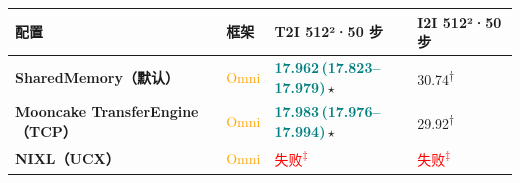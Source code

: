 \begin{tabularx}{\textwidth}{>{\bfseries}p{5.9cm} p{0.9cm} Y Y}
\toprule
{}
配置 & 框架 & T2I 512²·50 步 & I2I 512²·50 步 \\
\midrule
SharedMemory（默认） & \textcolor{Orange}{Omni} & \textbf{\textcolor{Teal}{17.962\,\textcolor{Muted}{(17.823--17.979)}}}\,$\star$ & \textcolor{Muted}{30.74\textsuperscript{†}} \\
Mooncake TransferEngine（TCP） & \textcolor{Orange}{Omni} & \textbf{\textcolor{Teal}{17.983\,\textcolor{Muted}{(17.976--17.994)}}}\,$\star$ & \textcolor{Muted}{29.92\textsuperscript{†}} \\
NIXL（UCX） & \textcolor{Orange}{Omni} & \textcolor{Red}{失败\textsuperscript{‡}} & \textcolor{Red}{失败\textsuperscript{‡}} \\
\bottomrule
\end{tabularx}
